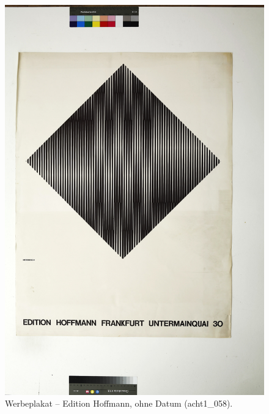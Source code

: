 \documentclass[a4paper,12pt,ngerman]{article}
\begin{document}
\newpage
\begin{figure}[ht]
\includegraphics[width=\linewidth]{Abbildung_34_(acht1_058)}
\centering
\caption{Werbeplakat – Edition Hoffmann, ohne Datum (acht1\_058).}
\end{figure}
\end{document}
